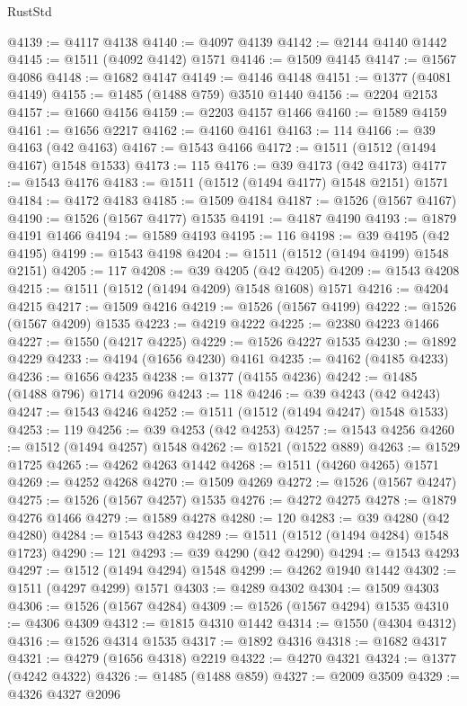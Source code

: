 \begin{lexlean}{RustStd}
\begin{coremodule}
{{@4139 := @4117 @4138
@4140 := @4097 @4139
@4142 := @2144 @4140 @1442
@4145 := @1511 (@4092 @4142) @1571
@4146 := @1509 @4145
@4147 := @1567 @4086
@4148 := @1682 @4147
@4149 := @4146 @4148
@4151 := @1377 (@4081 @4149)
@4155 := @1485 (@1488 @759) @3510 @1440
@4156 := @2204 @2153
@4157 := @1660 @4156
@4159 := @2203 @4157 @1466
@4160 := @1589 @4159
@4161 := @1656 @2217
@4162 := @4160 @4161
@4163 := 114
@4166 := @39 @4163 (@42 @4163)
@4167 := @1543 @4166
@4172 := @1511 (@1512 (@1494 @4167) @1548 @1533)
@4173 := 115
@4176 := @39 @4173 (@42 @4173)
@4177 := @1543 @4176
@4183 := @1511 (@1512 (@1494 @4177) @1548 @2151) @1571
@4184 := @4172 @4183
@4185 := @1509 @4184
@4187 := @1526 (@1567 @4167)
@4190 := @1526 (@1567 @4177) @1535
@4191 := @4187 @4190
@4193 := @1879 @4191 @1466
@4194 := @1589 @4193
@4195 := 116
@4198 := @39 @4195 (@42 @4195)
@4199 := @1543 @4198
@4204 := @1511 (@1512 (@1494 @4199) @1548 @2151)
@4205 := 117
@4208 := @39 @4205 (@42 @4205)
@4209 := @1543 @4208
@4215 := @1511 (@1512 (@1494 @4209) @1548 @1608) @1571
@4216 := @4204 @4215
@4217 := @1509 @4216
@4219 := @1526 (@1567 @4199)
@4222 := @1526 (@1567 @4209) @1535
@4223 := @4219 @4222
@4225 := @2380 @4223 @1466
@4227 := @1550 (@4217 @4225)
@4229 := @1526 @4227 @1535
@4230 := @1892 @4229
@4233 := @4194 (@1656 @4230) @4161
@4235 := @4162 (@4185 @4233)
@4236 := @1656 @4235
@4238 := @1377 (@4155 @4236)
@4242 := @1485 (@1488 @796) @1714 @2096
@4243 := 118
@4246 := @39 @4243 (@42 @4243)
@4247 := @1543 @4246
@4252 := @1511 (@1512 (@1494 @4247) @1548 @1533)
@4253 := 119
@4256 := @39 @4253 (@42 @4253)
@4257 := @1543 @4256
@4260 := @1512 (@1494 @4257) @1548
@4262 := @1521 (@1522 @889)
@4263 := @1529 @1725
@4265 := @4262 @4263 @1442
@4268 := @1511 (@4260 @4265) @1571
@4269 := @4252 @4268
@4270 := @1509 @4269
@4272 := @1526 (@1567 @4247)
@4275 := @1526 (@1567 @4257) @1535
@4276 := @4272 @4275
@4278 := @1879 @4276 @1466
@4279 := @1589 @4278
@4280 := 120
@4283 := @39 @4280 (@42 @4280)
@4284 := @1543 @4283
@4289 := @1511 (@1512 (@1494 @4284) @1548 @1723)
@4290 := 121
@4293 := @39 @4290 (@42 @4290)
@4294 := @1543 @4293
@4297 := @1512 (@1494 @4294) @1548
@4299 := @4262 @1940 @1442
@4302 := @1511 (@4297 @4299) @1571
@4303 := @4289 @4302
@4304 := @1509 @4303
@4306 := @1526 (@1567 @4284)
@4309 := @1526 (@1567 @4294) @1535
@4310 := @4306 @4309
@4312 := @1815 @4310 @1442
@4314 := @1550 (@4304 @4312)
@4316 := @1526 @4314 @1535
@4317 := @1892 @4316
@4318 := @1682 @4317
@4321 := @4279 (@1656 @4318) @2219
@4322 := @4270 @4321
@4324 := @1377 (@4242 @4322)
@4326 := @1485 (@1488 @859)
@4327 := @2009 @3509
@4329 := @4326 @4327 @2096
}}
\end{coremodule}
\end{lexlean}
